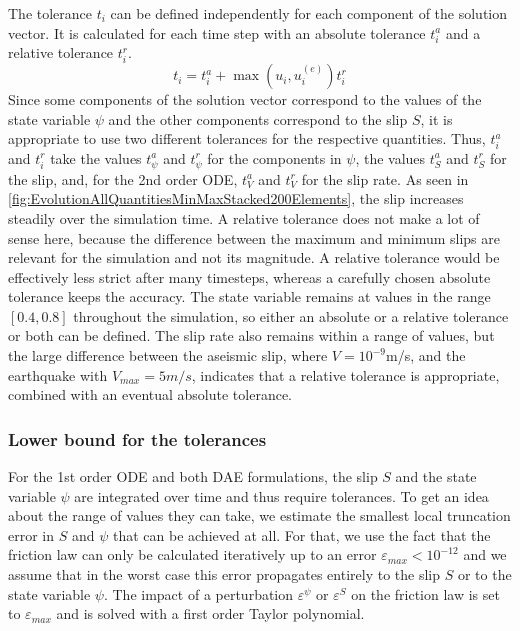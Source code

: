 The tolerance $t_i$ can be defined independently for each component of the solution vector. It is calculated for each time step with an absolute tolerance $t_i^a$ and a relative tolerance $t_i^r$. 
\begin{equation}
t_i = t_i^a + \max\left(u_i,u_i^{(e)}\right)t_i^r
\end{equation}
Since some components of the solution vector correspond to the values of the state variable $\psi$ and the other components correspond to the slip $S$, it is appropriate to use two different tolerances for the respective quantities. Thus, $t_i^a$ and $t_i^r$ take the values $t_\psi^a$ and $t_\psi^r$ for the components in $\psi$, the values $t_S^a$ and $t_S^r$ for the slip, and, for the 2nd order ODE, $t_V^a$ and $t_V^r$ for the slip rate. As seen in \autoref{fig:EvolutionAllQuantitiesMinMaxStacked200Elements}, the slip increases steadily over the simulation time. A relative tolerance does not make a lot of sense here, because the difference between the maximum and minimum slips are relevant for the simulation and not its magnitude. A relative tolerance would be effectively less strict after many timesteps, whereas a carefully chosen absolute tolerance keeps the accuracy. The state variable remains at values in the range $[0.4, 0.8]$ throughout the simulation, so either an absolute or a relative tolerance or both can be defined. The slip rate also remains within a range of values, but the large difference between the aseismic slip, where $V=10^{-9}$m/s, and the earthquake with $V_{max}=5m/s$, indicates that a relative tolerance is appropriate, combined with an eventual absolute tolerance. 

\subsubsection{Lower bound for the tolerances}
\label{ssec:LowerBoundTimeTolerance}
For the 1st order ODE and both DAE formulations, the slip $S$ and the state variable $\psi$ are integrated over time and thus require tolerances. To get an idea about the range of values they can take, we estimate the smallest local truncation error in  $S$ and $\psi$ that can be achieved at all. For that, we use the fact that the friction law can only be calculated iteratively up to an error $\varepsilon_{max} < 10^{-12}$ and we assume that in the worst case this error propagates entirely to the slip $S$ or to the state variable $\psi$. The impact of a perturbation $\varepsilon^{\psi}$ or $\varepsilon^{S}$ on the friction law is set to $\varepsilon_{max}$ and is solved with a first order Taylor polynomial.


